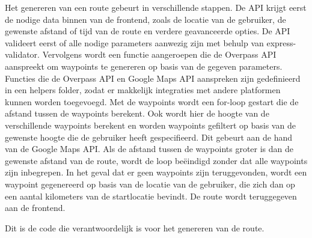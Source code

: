     Het genereren van een route gebeurt in verschillende stappen. 
    De API krijgt eerst de nodige data binnen van de frontend, zoals de locatie van de gebruiker, de gewenste afstand of tijd van de route en verdere geavanceerde opties. 
    De API valideert eerst of alle nodige parameters aanwezig zijn met behulp van express-validator. 
    Vervolgens wordt een functie aangeroepen die de Overpass API aanspreekt om waypoints te genereren op basis van de gegeven parameters. 
    Functies die de Overpass API en Google Maps API aanspreken zijn gedefinieerd in een helpers folder, zodat er makkelijk integraties met andere platformen kunnen worden toegevoegd. 
    Met de waypoints wordt een for-loop gestart die de afstand tussen de waypoints berekent. Ook wordt hier de hoogte van de verschillende waypoints berekent en worden waypoints gefiltert 
    op basis van de gewenste hoogte die de gebruiker heeft gespecifieerd. Dit gebeurt aan de hand van de Google Maps API.
    Als de afstand tussen de waypoints groter is dan de gewenste afstand van de route,
    wordt de loop beëindigd zonder dat alle waypoints zijn inbegrepen. 
    In het geval dat er geen waypoints zijn teruggevonden, wordt een waypoint gegenereerd op basis van de locatie van de gebruiker, die zich dan op een aantal kilometers van de startlocatie bevindt. 
    De route wordt teruggegeven aan de frontend.

    \pagebreak

Dit is de code die verantwoordelijk is voor het genereren van de route.

